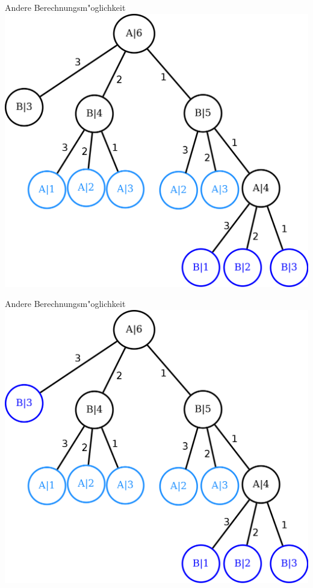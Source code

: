\documentclass[18pt]{beamer}
\begin{document}
\begin{frame}{Andere Berechnungsm"oglichkeit}
\includegraphics[scale=0.55]{baum13.png}
\end{frame}

\begin{frame}{Andere Berechnungsm"oglichkeit}
\includegraphics[scale=0.55]{baum14.png}
\end{frame}
\end{document}
